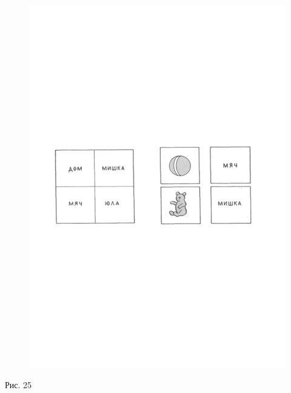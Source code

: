 \documentclass[a5paper]{book}
\begin{document}
\begin{figure}
\centering
\includegraphics[width=\linewidth]{media/media/image22.png}
\end{figure}

Рис. 25
\end{document}
